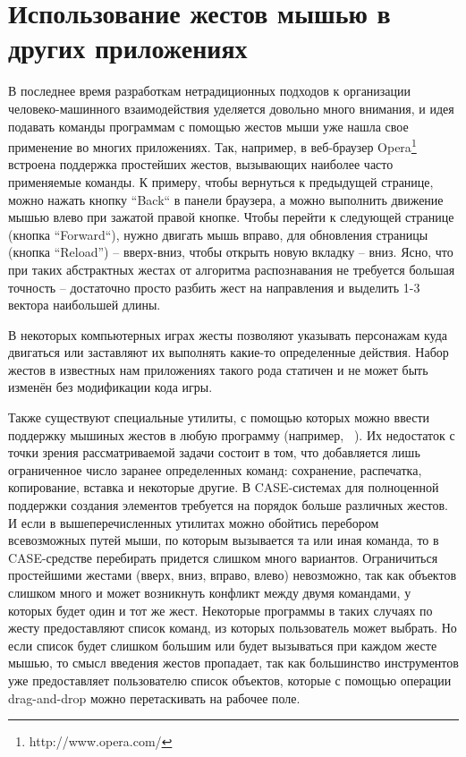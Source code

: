 \documentclass[a5paper]{article}
\begin{document}
\section{Использование жестов мышью в других приложениях}

В последнее время разработкам нетрадиционных подходов к организации человеко-машинного взаимодействия уделяется довольно много 
внимания, и идея подавать команды программам с помощью жестов мыши уже нашла свое применение во многих приложениях. Так, например, 
в веб-браузер Opera\footnote{http://www.opera.com/} встроена поддержка простейших жестов, вызывающих наиболее часто применяемые команды. К примеру, чтобы вернуться 
к предыдущей странице, можно нажать кнопку ``Back`` в панели браузера, а можно выполнить движение мышью влево при зажатой правой кнопке. 
Чтобы перейти к следующей странице (кнопка ``Forward``), нужно двигать мышь вправо, для обновления страницы (кнопка ``Reload'') -- вверх-вниз,
чтобы открыть новую вкладку -- вниз. Ясно, что при таких абстрактных жестах от алгоритма распознавания не требуется
большая точность -- достаточно просто разбить жест на направления и выделить 1-3 вектора наибольшей длины.

В некоторых компьютерных играх жесты позволяют указывать персонажам куда двигаться или заставляют их выполнять какие-то определенные
действия. Набор жестов в известных нам приложениях такого рода статичен и не может быть изменён без модификации кода игры.

Также существуют специальные утилиты, с помощью которых можно ввести поддержку мышиных жестов в любую программу 
(например, ~\cite{strokeIt, gMote, xstroke, flyGesture}).
Их недостаток с точки зрения рассматриваемой задачи состоит в том, что добавляется лишь ограниченное число заранее определенных команд: 
сохранение, распечатка, копирование, вставка и некоторые другие. В CASE-системах для полноценной поддержки создания элементов требуется на порядок больше различных жестов. И если в
вышеперечисленных утилитах можно обойтись перебором всевозможных путей мыши, по которым вызывается та или иная команда, то в CASE-средстве 
перебирать придется слишком много вариантов. Ограничиться простейшими жестами (вверх, вниз, вправо, влево) невозможно, так как 
объектов слишком много и может возникнуть конфликт между двумя командами, у которых будет один и тот же жест. Некоторые программы 
в таких случаях по жесту предоставляют список команд, из которых пользователь может выбрать. Но если список будет слишком большим или 
будет вызываться при каждом жесте мышью, то смысл введения жестов пропадает, так как большинство инструментов уже 
предоставляет пользователю список объектов, которые с помощью операции drag-and-drop можно перетаскивать на рабочее поле.
\end{document}
